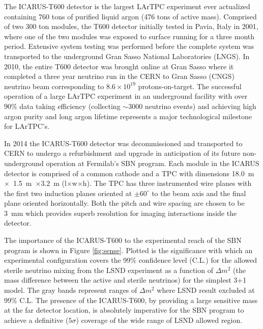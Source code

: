 \label{sec:IF_ICARUS}
The ICARUS-T600 detector is the largest LArTPC experiment ever actualized containing 760 tons of purified liquid argon (476 tons of active mass). Comprised of two 300 ton modules, the T600 detector initially tested in Pavia, Italy in 2001, where one of the two modules was exposed to surface running for a three month period. Extensive system testing was performed before the complete system was transported to the underground Gran Sasso National Laboratories (LNGS). In 2010, the entire T600 detector was brought online at Gran Sasso where it completed a three year neutrino run in the CERN to Gran Sasso (CNGS) neutrino beam corresponding to $8.6 \times 10^{19}$ protons-on-target. The successful operation of a large LArTPC experiment in an underground facility with over $90\%$ data taking efficiency (collecting $\sim$3000 neutrino events) and achieving high argon purity and long argon lifetime represents a major technological milestone for LArTPC's.

In 2014 the ICARUS-T600 detector was decommissioned and transported to CERN to undergo a refurbishment and upgrade in anticipation of its future non-underground operation at Fermilab's SBN program. Each module in the ICARUS detector is comprised of a common cathode and a TPC with dimensions 18.0~m~$\times$~1.5~m~$\times$3.2~m (l$\times$w$\times$h). The TPC has three instrumented wire planes with the first two induction planes oriented at $\pm 60^{\circ}$ to the beam axis and the final plane oriented horizontally. Both the pitch and wire spacing are chosen to be 3~mm which provides superb resolution for imaging interactions inside the detector. 


The importance of the ICARUS-T600 to the experimental reach of the SBN program is shown in Figure \ref{fig:sense}. Plotted is the significance with which an experimental configuration covers the 99$\%$ confidence level (C.L.) for the allowed sterile neutrino mixing from the LSND experiment as a function of $\Delta m^{2}$ (the mass difference between the active and sterile neutrinos) for the simplest 3+1 model. The gray bands represent ranges of $\Delta m^{2}$ where LSND result excluded at 99$\%$ C.L. The presence of the ICARUS-T600, by providing a large sensitive mass at the far detector location, is absolutely imperative for the SBN program to achieve a definitive ($5\sigma$) coverage of the wide range of LSND allowed region.


